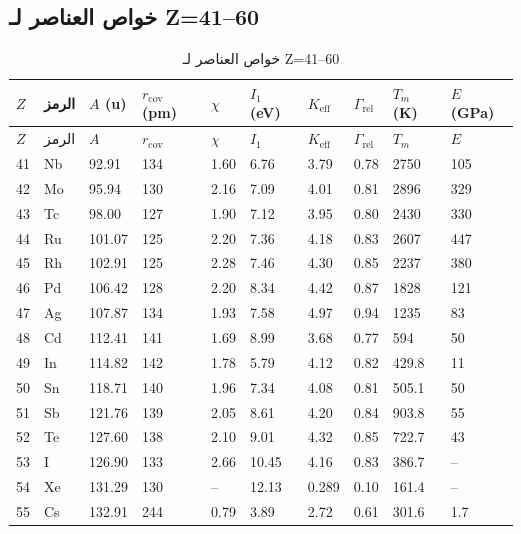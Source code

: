 \documentclass[11pt,a4paper]{article}
\newcommand{\Keff}{K_{\mathrm{eff}}}
\begin{document}
\begin{otherlanguage}{arabic}
		\subsection*{خواص العناصر لـ Z=41–60}
		
		\begin{longtable}{p{0.6cm}p{1.2cm}p{1.2cm}p{1.2cm}p{1.2cm}p{1.2cm}p{1.5cm}p{1.2cm}p{1.2cm}p{1.2cm}}
			\caption{خواص العناصر لـ Z=41–60} \label{tab:elem-data-41to60} \\
			\toprule
			\(Z\) & الرمز & \(A\) (u) & \(r_{\text{cov}}\) (pm) & \(\chi\) & \(I_1\) (eV) & \(\Keff\) & \(\Gamma_{\text{rel}}\) & \(T_m\) (K) & \(E\) (GPa) \\
			\midrule
			\endfirsthead
			\toprule
			\(Z\) & الرمز & \(A\) & \(r_{\text{cov}}\) & \(\chi\) & \(I_1\) & \(\Keff\) & \(\Gamma_{\text{rel}}\) & \(T_m\) & \(E\) \\
			\midrule
			\endhead
			41 & Nb & 92.91 & 134 & 1.60 & 6.76 & 3.79 & 0.78 & 2750 & 105 \\
			42 & Mo & 95.94 & 130 & 2.16 & 7.09 & 4.01 & 0.81 & 2896 & 329 \\
			43 & Tc & 98.00 & 127 & 1.90 & 7.12 & 3.95 & 0.80 & 2430 & 330 \\
			44 & Ru & 101.07 & 125 & 2.20 & 7.36 & 4.18 & 0.83 & 2607 & 447 \\
			45 & Rh & 102.91 & 125 & 2.28 & 7.46 & 4.30 & 0.85 & 2237 & 380 \\
			46 & Pd & 106.42 & 128 & 2.20 & 8.34 & 4.42 & 0.87 & 1828 & 121 \\
			47 & Ag & 107.87 & 134 & 1.93 & 7.58 & 4.97 & 0.94 & 1235 & 83 \\
			48 & Cd & 112.41 & 141 & 1.69 & 8.99 & 3.68 & 0.77 & 594 & 50 \\
			49 & In & 114.82 & 142 & 1.78 & 5.79 & 4.12 & 0.82 & 429.8 & 11 \\
			50 & Sn & 118.71 & 140 & 1.96 & 7.34 & 4.08 & 0.81 & 505.1 & 50 \\
			51 & Sb & 121.76 & 139 & 2.05 & 8.61 & 4.20 & 0.84 & 903.8 & 55 \\
			52 & Te & 127.60 & 138 & 2.10 & 9.01 & 4.32 & 0.85 & 722.7 & 43 \\
			53 & I  & 126.90 & 133 & 2.66 & 10.45 & 4.16 & 0.83 & 386.7 & – \\
			54 & Xe & 131.29 & 130 & –    & 12.13 & 0.289 & 0.10 & 161.4 & – \\
			55 & Cs & 132.91 & 244 & 0.79 & 3.89 & 2.72 & 0.61 & 301.6 & 1.7 \\

\end{longtable}
\end{otherlanguage}
\end{document}
